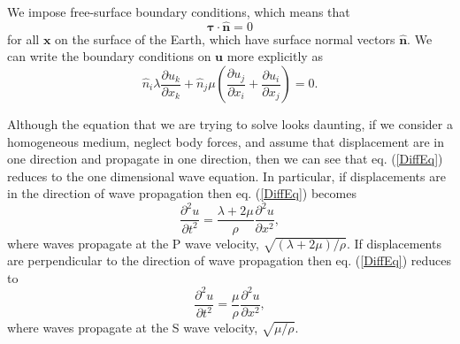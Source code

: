 \documentclass[12pt]{article}
\begin{document}
We impose free-surface boundary conditions, which means that
\begin{equation}\label{BoundaryCondition}
  \boldsymbol{\tau}\cdot\boldsymbol{\hat{n}} = 0
\end{equation}
for all $\boldsymbol{x}$ on the surface of the Earth, which have
surface normal vectors $\boldsymbol{\hat{n}}$.  We can write the
boundary conditions on $\boldsymbol{u}$ more explicitly as
\begin{equation}\label{BoundaryConditionExplicit}
  \hat{n}_i\lambda\frac{\partial u_k}{\partial x_k} +
  \hat{n}_j\mu\left(\frac{\partial u_j}{\partial x_i} +
  \frac{\partial u_i}{\partial x_j}\right) = 0.
\end{equation}

Although the equation that we are trying to solve looks daunting, if
we consider a homogeneous medium, neglect body forces, and assume
that displacement are in one direction and propagate in one direction,
then we can see that eq. (\ref{DiffEq}) reduces to the one dimensional
wave equation. In particular, if displacements are in the direction of
wave propagation then eq. (\ref{DiffEq}) becomes
\begin{equation}\label{1DS}
  \frac{\partial^2 u}{\partial t^2} = \frac{\lambda + 2\mu}{\rho}\frac{\partial^2 u}{\partial x^2},
\end{equation}
where waves propagate at the P wave velocity, $\sqrt{(\lambda +
  2\mu)/\rho}$. If displacements are perpendicular to the direction of
wave propagation then eq. (\ref{DiffEq}) reduces to
\begin{equation}\label{1DP}
  \frac{\partial^2 u}{\partial t^2} = \frac{\mu}{\rho}\frac{\partial^2 u}{\partial x^2},
\end{equation}
where waves propagate at the S wave velocity, $\sqrt{\mu/\rho}$.  
\end{document}
